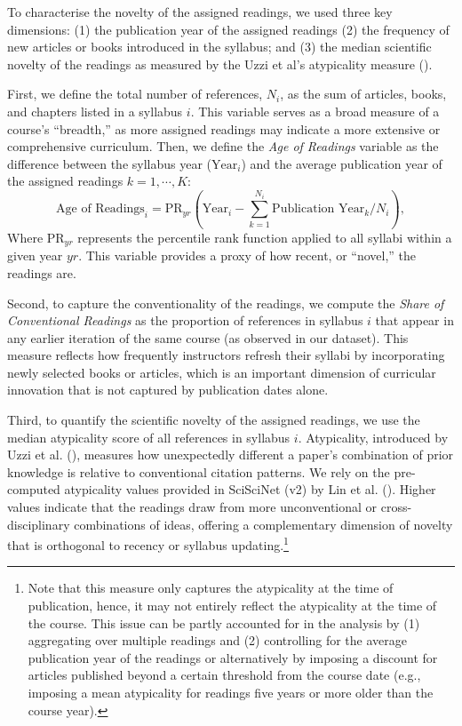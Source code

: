 \documentclass[
  british,
  12pt,
]{article}
\begin{document}
To characterise the novelty of the assigned readings, we used three key dimensions: (1) the publication year of the assigned readings (2) the frequency of new articles or books introduced in the syllabus; and (3) the median scientific novelty of the readings as measured by the Uzzi et al's atypicality measure ().

First, we define the total number of references, \(N_i\), as the sum of articles, books, and chapters listed in a syllabus \(i\). This variable serves as a broad measure of a course's ``breadth,'' as more assigned readings may indicate a more extensive or comprehensive curriculum. Then, we define the \emph{Age of Readings} variable as the difference between the syllabus year (\(\text{Year}_i\)) and the average publication year of the assigned readings \(k=1,\cdots,K\):\\
\[
  \text{Age of Readings}_i =
  \text{PR}_{yr}\left(\text{Year}_i - \sum_{k=1}^{N_i} \text{Publication Year}_k / N_i\right),
\]
Where \(\text{PR}_{yr}\) represents the percentile rank function applied to all syllabi within a given year \(yr\). This variable provides a proxy of how recent, or ``novel,'' the readings are.

Second, to capture the conventionality of the readings, we compute the \emph{Share of Conventional Readings} as the proportion of references in syllabus \(i\) that appear in any earlier iteration of the same course (as observed in our dataset). This measure reflects how frequently instructors refresh their syllabi by incorporating newly selected books or articles, which is an important dimension of curricular innovation that is not captured by publication dates alone.

Third, to quantify the scientific novelty of the assigned readings, we use the median atypicality score of all references in syllabus \(i\). Atypicality, introduced by Uzzi et al. (), measures how unexpectedly different a paper's combination of prior knowledge is relative to conventional citation patterns. We rely on the pre-computed atypicality values provided in SciSciNet (v2) by Lin et al. (). Higher values indicate that the readings draw from more unconventional or cross-disciplinary combinations of ideas, offering a complementary dimension of novelty that is orthogonal to recency or syllabus updating.\footnote{
  Note that this measure only captures the atypicality at the time of publication, hence, it may not entirely reflect the atypicality at the time of the course. This issue can be partly accounted for in the analysis by (1) aggregating over multiple readings and (2) controlling for the average publication year of the readings or alternatively by imposing a discount for articles published beyond a certain threshold from the course date (e.g., imposing a mean atypicality for readings five years or more older than the course year).}
\end{document}
